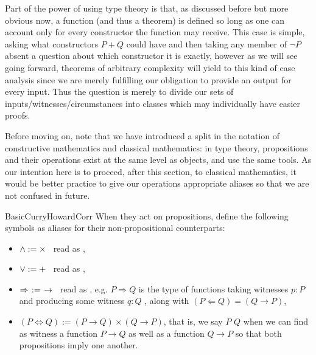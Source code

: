 \documentclass[11pt]{article}
\begin{document}
Part of the power of using type theory is that, as discussed before but more obvious now, a function (and thus a theorem) is defined so long as one can account only for every constructor the function may receive. This case is simple, asking what constructors $P + Q$ could have and then taking any member of $\neg P$ absent a question about which constructor it is exactly, however as we will see going forward, theorems of arbitrary complexity will yield to this kind of case analysis since we are merely fulfilling our obligation to provide an output for every input. Thus the question  is merely to divide our sets of inputs/witnesses/circumstances into classes which may individually have easier proofs.

Before moving on, note that we have introduced a split in the notation of constructive mathematics and classical mathematics: in type theory, propositions and their operations exist at the same level as objects, and use the same tools. As our intention here is to proceed, after this section, to classical mathematics, it would be better practice to give our operations appropriate aliases so that we are not confused in future.

\begin{label notation}{BasicCurryHowardCorr}
When they act on propositions, define the following symbols as aliases for their non-propositional counterparts:
\begin{itemize}
\item $\wedge := \times \hspace{0.5em}$ read as ,
\item $\vee := + \hspace{0.5em}$ read as ,
\item $\Rightarrow \hspace{4pt} := \hspace{4pt} \to \hspace{0.5em}$ read as , e.g. $P \Rightarrow Q$ is the type of functions taking witnesses $p \colon P$ and producing some witness $q \colon Q$ , along with $(P \Leftarrow Q) = (Q \rightarrow P)$,
\item $(P \Leftrightarrow Q) := (P \to Q) \times (Q \to P)$, that is, we say $P$  $Q$ when we can find as witness a function $P \to Q$ as well as a function $Q \to P$ so that both propositions imply one another.
\end{itemize}
\end{label notation}
\end{document}
